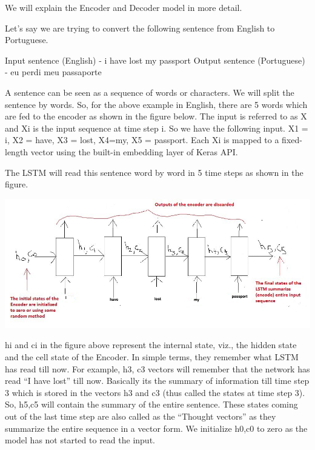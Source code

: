 \documentclass{llncs}
\begin{document}
	We will explain the  Encoder and Decoder model in more detail.  
	
	Let's say we are trying to convert the following sentence from English to Portuguese.

	Input sentence (English) - i have lost my passport
	Output sentence (Portuguese) - eu perdi meu passaporte
	
	A sentence can be seen as a sequence of words or characters. We will split the sentence by words. So, for the above example in English, there are 5 words which are fed to the encoder as shown in the figure below. The input is referred to as X and X{i} is the input sequence at time step i. So we have the following input.
	X{1} = i, X{2} = have, X{3} = lost,  X{4}=my, X{5} = passport.
	Each X{i} is mapped to a fixed-length vector using the built-in embedding layer of Keras API.
	
	The LSTM will read this sentence word by word in 5 time steps as shown in the figure.
	
	\begin{minipage}{\linewidth}
		\begin{center}
			\includegraphics[width=\linewidth]{EncoderLSTM.jpeg}
			\label{fig:Encoder LSTM}
		\end{center}
	\end{minipage}
	\afterpage{\clearpage}
	
 	h{i} and c{i} in the figure above represent the internal state, viz., the hidden state and the cell state of the Encoder. In simple terms, they remember what LSTM has read till now. 
 	For example, 
 	h{3}, c{3} vectors will remember that the network has read “I have lost” till now. Basically its the summary of information till time step 3 which is stored in the vectors h3 and c3 (thus called the states at time step 3). So, h{5},c{5} will contain the summary of the entire sentence. These states coming out of the last time step are also called as the “Thought vectors” as they summarize the entire sequence in a vector form. We initialize h{0},c{0} to zero as the model has not started to read the input.
 	
\end{document}
